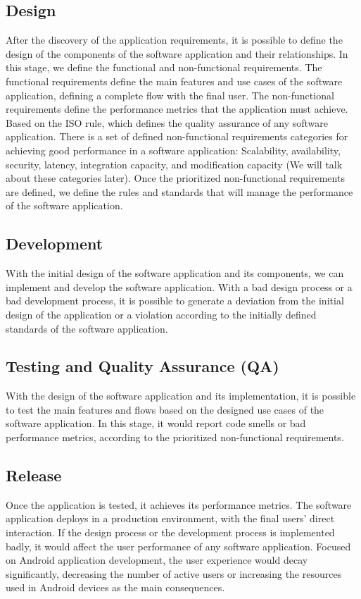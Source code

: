\subsection{Design}
After the discovery of the application requirements, it is possible to define the design of the components of the software application and their relationships. In this stage, we define the functional and non-functional requirements. The functional requirements define the main features and use cases of the software application, defining a complete flow with the final user. The non-functional requirements define the performance metrics that the application must achieve. Based on the ISO rule, which defines the quality assurance of any software application. There is a set of defined non-functional requirements categories for achieving good performance in a software application: Scalability, availability, security, latency, integration capacity, and modification capacity (We will talk about these categories later). Once the prioritized non-functional requirements are defined, we define the rules and standards that will manage the performance of the software application.

\subsection{Development}
With the initial design of the software application and its components, we can implement and develop the software application. With a bad design process or a bad development process, it is possible to generate a deviation from the initial design of the application or a violation according to the initially defined standards of the software application.

\subsection{Testing and Quality Assurance (QA)}
With the design of the software application and its implementation, it is possible to test the main features and flows based on the designed use cases of the software application. In this stage, it would report code smells or bad performance metrics, according to the prioritized non-functional requirements.

\subsection{Release}
Once the application is tested, it achieves its performance metrics. The software application deploys in a production environment, with the final users' direct interaction. If the design process or the development process is implemented badly, it would affect the user performance of any software application. Focused on Android application development, the user experience would decay significantly, decreasing the number of active users or increasing the resources used in Android devices as the main consequences.

